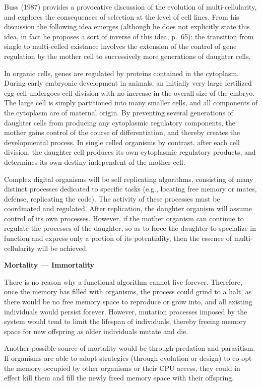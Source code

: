 Buss (1987) provides a provocative discussion of the evolution of
multi-cellularity, and explores the consequences of selection at the
level of cell lines.  From his discussion the following idea emerges
(although he does not explicitly state this idea, in fact he proposes
a sort of inverse of this idea, p.\ 65): the transition from single
to multi-celled existance involves the extension of the control of
gene regulation by the mother cell to successively more generations of
daughter cells.

In organic cells, genes are regulated by proteins contained in the
cytoplasm.  During early embryonic development in animals, an initially
very large fertilized egg cell undergoes cell division with no increase in
the overall size of the embryo.  The large cell is simply partitioned into
many smaller cells, and all components of the cytoplasm are of maternal
origin.  By preventing several generations of daughter cells from producing
any cytoplasmic regulatory components, the mother gains control of the course
of differentiation, and thereby creates the developmental process.  In single
celled organisms by contrast, after each cell division, the daughter cell
produces its own cytoplasmic regulatory products, and determines its own
destiny independent of the mother cell.

Complex digital organisms will be self replicating algorithms, consisting
of many distinct processes dedicated to specific tasks (e.g., locating
free memory or mates, defense, replicating the code).  The activity of these
processes must be coordinated and regulated.  After replication,
the daughter organism will assume control of its own processes.  However,
if the mother organism can continue to regulate the processes of the
daughter, so as to force the daughter to specialize in function and
express only a portion of its potentiality, then the essence of
multi-cellularity will be achieved.

\LP
\bf Mortality --- Immortality\rm
\eLP

There is no reason why a functional algorithm cannot live forever.
Therefore, once the memory has filled with organisms, the process could
grind to a halt, as there would be no free memory space to reproduce or
grow into, and all existing individuals would persist forever.  However,
mutation processes imposed by the system would tend to limit the
lifespan of individuals, thereby freeing memory space for new offspring
as older individuals mutate and die.

Another possible source of mortality would be through predation and
parasitism.  If organisms are able to adopt strategies (through
evolution or design) to co-opt the memory occupied by other organisms
or their CPU access, they could in effect kill them and fill the newly
freed memory space with their offspring.

